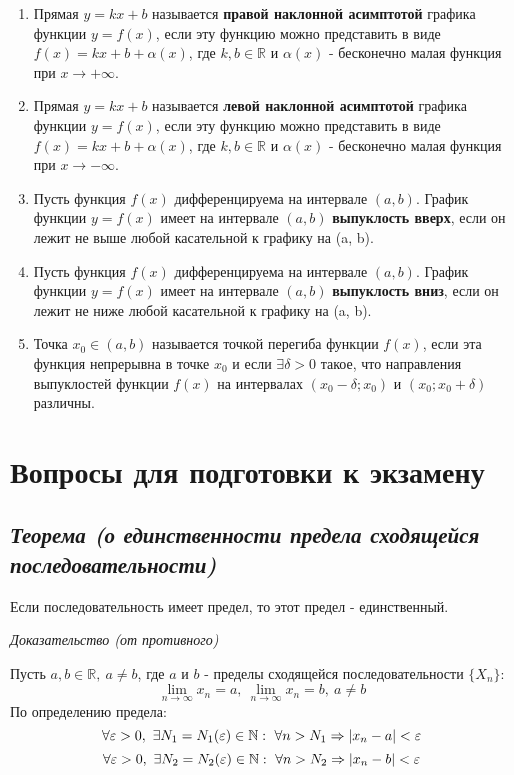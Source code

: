 \begin{enumerate}
\item Прямая $y = kx + b$ называется \textbf{правой наклонной асимптотой} графика функции $y = f(x)$, если эту функцию можно представить в виде $f(x) = kx + b + \alpha(x)$, где $k, b \in \mathbb{R}$ и $\alpha(x)$ - бесконечно малая функция при $x \rightarrow +\infty$.
\item Прямая $y = kx + b$ называется \textbf{левой наклонной асимптотой} графика функции $y = f(x)$, если эту функцию можно представить в виде $f(x) = kx + b + \alpha(x)$, где $k, b \in \mathbb{R}$ и $\alpha(x)$ - бесконечно малая функция при $x \rightarrow -\infty$.
\item Пусть функция $f(x)$ дифференцируема на интервале $(a, b)$. График функции $y = f(x)$ имеет на интервале $(a, b)$ \textbf{выпуклость вверх}, если он лежит не выше любой касательной к графику на (a, b).
\item Пусть функция $f(x)$ дифференцируема на интервале $(a, b)$. График функции $y = f(x)$ имеет на интервале $(a, b)$ \textbf{выпуклость вниз}, если он лежит не ниже любой касательной к графику на (a, b).
\item Точка $x_0 \in (a,b)$ называется точкой перегиба функции $f(x)$, если эта функция непрерывна в точке $x_0$ и если $\exists \delta > 0$ такое, что направления выпуклостей функции $f(x)$ на интервалах $(x_0-\delta; x_0)$ и $(x_0; x_0+\delta)$ различны.

\end{enumerate}
\section{Вопросы для подготовки к экзамену}
\subsection{\textit{Теорема (о единственности предела сходящейся последовательности)}}

Если последовательность имеет предел, то этот предел - единственный.

\textit{Доказательство (от противного)}

Пусть $a, b \in \mathbb{R}, \ a \neq b$, где $a$ и $b$ - пределы сходящейся последовательности $\{X_n\}$: $$\lim\limits_{n \to \infty} x_n = a,\ \lim\limits_{n \to \infty} x_n = b, \ a \neq b$$ По определению предела: $$\forall {\large\varepsilon} > 0, \ \exists N_1 = N_1({\large\varepsilon}) \in \mathbb{N} : \ \forall n > N_1 \Rightarrow  | x_n - a|  < {\large\varepsilon} $$ $$\forall {\large\varepsilon} > 0, \ \exists N_2 = N_2({\large\varepsilon}) \in \mathbb{N} : \ \forall n > N_2 \Rightarrow  | x_n - b|  < {\large\varepsilon} $$

